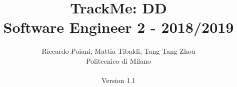 \documentclass[a4paper]{article}
\begin{document}
\title{TrackMe: DD \\Software Engineer 2 - 2018/2019}
\author{
        Riccardo Poiani, Mattia Tibaldi, Tang-Tang Zhou \\
        Politecnico di Milano\\\\ 
        Version 1.1
}
\maketitle
\newpage
\tableofcontents
\newpage



\newpage



\newpage



\newpage



\newpage



\newpage



\newpage
\end{document}
